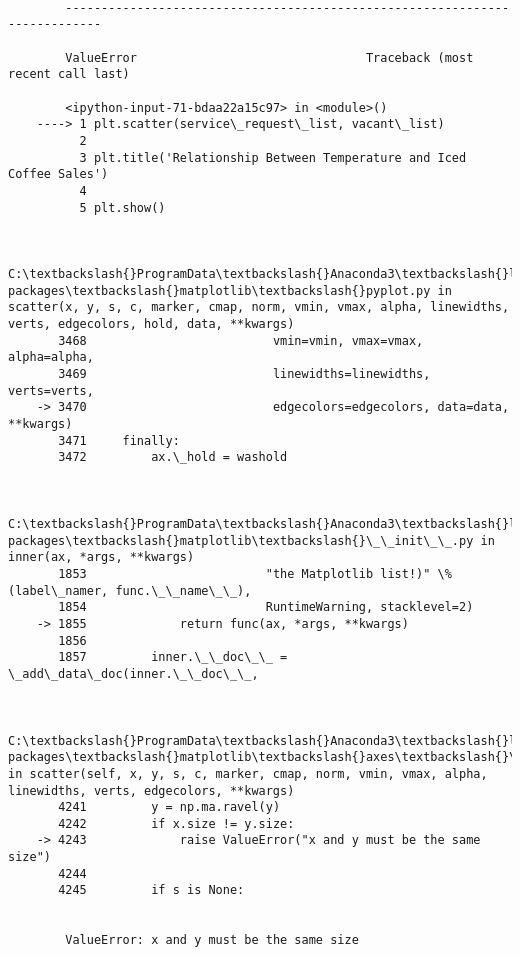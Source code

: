 \documentclass[11pt]{article}
\begin{document}
    \begin{Verbatim}[commandchars=\\\{\}]

        ---------------------------------------------------------------------------

        ValueError                                Traceback (most recent call last)

        <ipython-input-71-bdaa22a15c97> in <module>()
    ----> 1 plt.scatter(service\_request\_list, vacant\_list)
          2 
          3 plt.title('Relationship Between Temperature and Iced Coffee Sales')
          4 
          5 plt.show()
    

        C:\textbackslash{}ProgramData\textbackslash{}Anaconda3\textbackslash{}lib\textbackslash{}site-packages\textbackslash{}matplotlib\textbackslash{}pyplot.py in scatter(x, y, s, c, marker, cmap, norm, vmin, vmax, alpha, linewidths, verts, edgecolors, hold, data, **kwargs)
       3468                          vmin=vmin, vmax=vmax, alpha=alpha,
       3469                          linewidths=linewidths, verts=verts,
    -> 3470                          edgecolors=edgecolors, data=data, **kwargs)
       3471     finally:
       3472         ax.\_hold = washold
    

        C:\textbackslash{}ProgramData\textbackslash{}Anaconda3\textbackslash{}lib\textbackslash{}site-packages\textbackslash{}matplotlib\textbackslash{}\_\_init\_\_.py in inner(ax, *args, **kwargs)
       1853                         "the Matplotlib list!)" \% (label\_namer, func.\_\_name\_\_),
       1854                         RuntimeWarning, stacklevel=2)
    -> 1855             return func(ax, *args, **kwargs)
       1856 
       1857         inner.\_\_doc\_\_ = \_add\_data\_doc(inner.\_\_doc\_\_,
    

        C:\textbackslash{}ProgramData\textbackslash{}Anaconda3\textbackslash{}lib\textbackslash{}site-packages\textbackslash{}matplotlib\textbackslash{}axes\textbackslash{}\_axes.py in scatter(self, x, y, s, c, marker, cmap, norm, vmin, vmax, alpha, linewidths, verts, edgecolors, **kwargs)
       4241         y = np.ma.ravel(y)
       4242         if x.size != y.size:
    -> 4243             raise ValueError("x and y must be the same size")
       4244 
       4245         if s is None:
    

        ValueError: x and y must be the same size

    \end{Verbatim}
\end{document}
